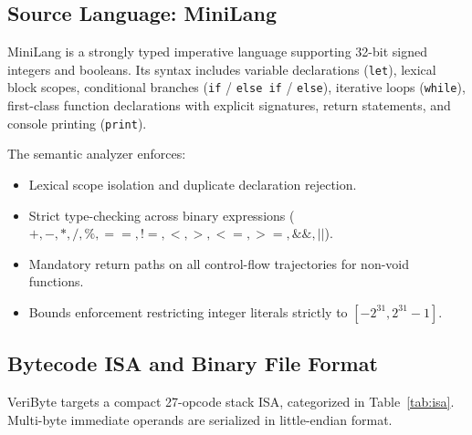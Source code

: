 \documentclass[conference]{IEEEtran}
\begin{document}
\subsection{Source Language: MiniLang}
MiniLang is a strongly typed imperative language supporting 32-bit signed integers and booleans. Its syntax includes variable declarations (\texttt{let}), lexical block scopes, conditional branches (\texttt{if} / \texttt{else if} / \texttt{else}), iterative loops (\texttt{while}), first-class function declarations with explicit signatures, return statements, and console printing (\texttt{print}).

The semantic analyzer enforces:
\begin{itemize}
    \item Lexical scope isolation and duplicate declaration rejection.
    \item Strict type-checking across binary expressions ($+, -, *, /, \%, ==, !=, <, >, <=, >=, \&\&, ||$).
    \item Mandatory return paths on all control-flow trajectories for non-void functions.
    \item Bounds enforcement restricting integer literals strictly to $[-2^{31}, 2^{31}-1]$.
\end{itemize}

\subsection{Bytecode ISA and Binary File Format}
VeriByte targets a compact 27-opcode stack ISA, categorized in Table~\ref{tab:isa}. Multi-byte immediate operands are serialized in little-endian format.
\end{document}
